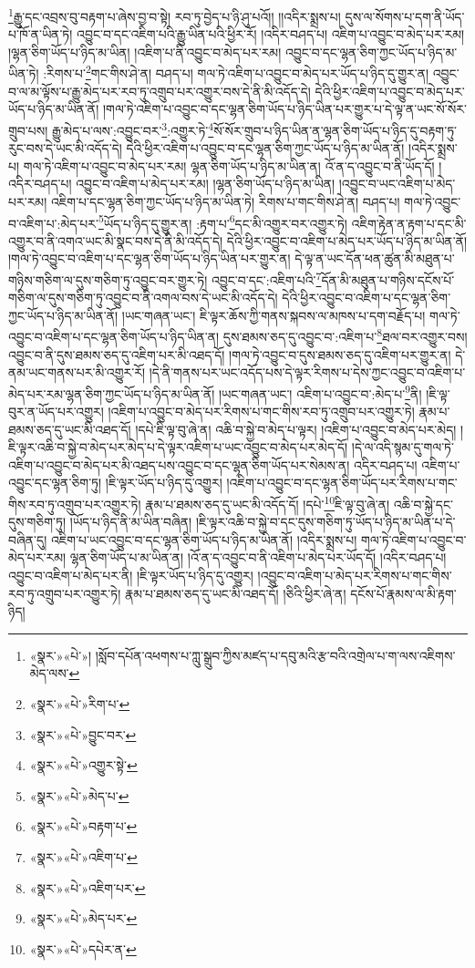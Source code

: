 \footnote{«སྣར་»«པེ་»། །སློབ་དཔོན་འཕགས་པ་ཀླུ་སྒྲུབ་ཀྱིས་མཛད་པ་དབུ་མའི་རྩ་བའི་འགྲེལ་པ་ག་ལས་འཇིགས་མེད་ལས་}རྒྱུ་དང་འབྲས་བུ་བརྟག་པ་ཞེས་བྱ་བ་སྟེ། རབ་ཏུ་བྱེད་པ་ཉི་ཤུ་པའོ།། །།འདིར་སྨྲས་པ། དུས་ལ་སོགས་པ་དག་ནི་ཡོད་པ་ཁོ་ན་ཡིན་ཏེ། འབྱུང་བ་དང་འཇིག་པའི་རྒྱུ་ཡིན་པའི་ཕྱིར་རོ། །འདིར་བཤད་པ། འཇིག་པ་འབྱུང་བ་མེད་པར་རམ། །ལྷན་ཅིག་ཡོད་པ་ཉིད་མ་ཡིན། །འཇིག་པ་ནི་འབྱུང་བ་མེད་པར་རམ། འབྱུང་བ་དང་ལྷན་ཅིག་ཀྱང་ཡོད་པ་ཉིད་མ་ཡིན་ཏེ། :རིགས་པ་\footnote{«སྣར་»«པེ་»རིག་པ་}གང་གིས་ཤེ་ན། བཤད་པ། གལ་ཏེ་འཇིག་པ་འབྱུང་བ་མེད་པར་ཡོད་པ་ཉིད་དུ་གྱུར་ན། འབྱུང་བ་ལ་མ་ལྟོས་པ་རྒྱུ་མེད་པར་རབ་ཏུ་འགྲུབ་པར་འགྱུར་བས་དེ་ནི་མི་འདོད་དེ། དེའི་ཕྱིར་འཇིག་པ་འབྱུང་བ་མེད་པར་ཡོད་པ་ཉིད་མ་ཡིན་ནོ། །གལ་ཏེ་འཇིག་པ་འབྱུང་བ་དང་ལྷན་ཅིག་ཡོད་པ་ཉིད་ཡིན་པར་གྱུར་པ་དེ་ལྟ་ན་ཡང་སོ་སོར་གྲུབ་པས། རྒྱུ་མེད་པ་ལས་:འབྱུང་བར་\footnote{«སྣར་»«པེ་»བྱུང་བར་}:འགྱུར་ཏེ་\footnote{«སྣར་»«པེ་»འགྱུར་སྟེ་}སོ་སོར་གྲུབ་པ་ཉིད་ཡིན་ན་ལྷན་ཅིག་ཡོད་པ་ཉིད་དུ་བརྟག་ཏུ་རུང་བས་དེ་ཡང་མི་འདོད་དེ། དེའི་ཕྱིར་འཇིག་པ་འབྱུང་བ་དང་ལྷན་ཅིག་ཀྱང་ཡོད་པ་ཉིད་མ་ཡིན་ནོ། །འདིར་སྨྲས་པ། གལ་ཏེ་འཇིག་པ་འབྱུང་བ་མེད་པར་རམ། ལྷན་ཅིག་ཡོད་པ་ཉིད་མ་ཡིན་ན། འོ་ན་ད་འབྱུང་བ་ནི་ཡོད་དོ། །འདིར་བཤད་པ། འབྱུང་བ་འཇིག་པ་མེད་པར་རམ། །ལྷན་ཅིག་ཡོད་པ་ཉིད་མ་ཡིན། །འབྱུང་བ་ཡང་འཇིག་པ་མེད་པར་རམ། འཇིག་པ་དང་ལྷན་ཅིག་ཀྱང་ཡོད་པ་ཉིད་མ་ཡིན་ཏེ། རིགས་པ་གང་གིས་ཤེ་ན། བཤད་པ། གལ་ཏེ་འབྱུང་བ་འཇིག་པ་:མེད་པར་\footnote{«སྣར་»«པེ་»མེད་པ་}ཡོད་པ་ཉིད་དུ་གྱུར་ན། :རྟག་པ་\footnote{«སྣར་»«པེ་»བརྟག་པ་}དང་མི་འགྱུར་བར་འགྱུར་ཏེ། འཇིག་རྟེན་ན་རྟག་པ་དང་མི་འགྱུར་བ་ནི་འགའ་ཡང་མི་སྣང་བས་དེ་ནི་མི་འདོད་དེ། དེའི་ཕྱིར་འབྱུང་བ་འཇིག་པ་མེད་པར་ཡོད་པ་ཉིད་མ་ཡིན་ནོ། །གལ་ཏེ་འབྱུང་བ་འཇིག་པ་དང་ལྷན་ཅིག་ཡོད་པ་ཉིད་ཡིན་པར་གྱུར་ན། དེ་ལྟ་ན་ཡང་དོན་ཕན་ཚུན་མི་མཐུན་པ་གཉིས་གཅིག་ལ་དུས་གཅིག་ཏུ་འབྱུང་བར་གྱུར་ཏེ། འབྱུང་བ་དང་:འཇིག་པའི་\footnote{«སྣར་»«པེ་»འཇིག་པ་}དོན་མི་མཐུན་པ་གཉིས་དངོས་པོ་གཅིག་ལ་དུས་གཅིག་ཏུ་འབྱུང་བ་ནི་འགལ་བས་དེ་ཡང་མི་འདོད་དེ། དེའི་ཕྱིར་འབྱུང་བ་འཇིག་པ་དང་ལྷན་ཅིག་ཀྱང་ཡོད་པ་ཉིད་མ་ཡིན་ནོ། །ཡང་གཞན་ཡང་། ཇི་ལྟར་ཆོས་ཀྱི་གནས་སྐབས་ལ་མཁས་པ་དག་བརྗོད་པ། གལ་ཏེ་འབྱུང་བ་འཇིག་པ་དང་ལྷན་ཅིག་ཡོད་པ་ཉིད་ཡིན་ན། དུས་ཐམས་ཅད་དུ་འབྱུང་བ་:འཇིག་པ་\footnote{«སྣར་»«པེ་»འཇིག་པར་}ཐལ་བར་འགྱུར་བས། འབྱུང་བ་ནི་དུས་ཐམས་ཅད་དུ་འཇིག་པར་མི་འཐད་དོ། །གལ་ཏེ་འབྱུང་བ་དུས་ཐམས་ཅད་དུ་འཇིག་པར་གྱུར་ན། དེ་ནམ་ཡང་གནས་པར་མི་འགྱུར་རོ། །དེ་ནི་གནས་པར་ཡང་འདོད་པས་དེ་ལྟར་རིགས་པ་དེས་ཀྱང་འབྱུང་བ་འཇིག་པ་མེད་པར་རམ་ལྷན་ཅིག་ཀྱང་ཡོད་པ་ཉིད་མ་ཡིན་ནོ། །ཡང་གཞན་ཡང་། འཇིག་པ་འབྱུང་བ་:མེད་པ་\footnote{«སྣར་»«པེ་»མེད་པར་}ནི། །ཇི་ལྟ་བུར་ན་ཡོད་པར་འགྱུར། །འཇིག་པ་འབྱུང་བ་མེད་པར་རིགས་པ་གང་གིས་རབ་ཏུ་འགྲུབ་པར་འགྱུར་ཏེ། རྣམ་པ་ཐམས་ཅད་དུ་ཡང་མི་འཐད་དོ། །དཔེ་ཇི་ལྟ་བུ་ཞེ་ན། འཆི་བ་སྐྱེ་བ་མེད་པ་ལྟར། །འཇིག་པ་འབྱུང་བ་མེད་པར་མེད། །ཇི་ལྟར་འཆི་བ་སྐྱེ་བ་མེད་པར་མེད་པ་དེ་ལྟར་འཇིག་པ་ཡང་འབྱུང་བ་མེད་པར་མེད་དོ། །དེ་ལ་འདི་སྙམ་དུ་གལ་ཏེ་འཇིག་པ་འབྱུང་བ་མེད་པར་མི་འཐད་པས་འབྱུང་བ་དང་ལྷན་ཅིག་ཡོད་པར་སེམས་ན། འདིར་བཤད་པ། འཇིག་པ་འབྱུང་དང་ལྷན་ཅིག་ཏུ། །ཇི་ལྟར་ཡོད་པ་ཉིད་དུ་འགྱུར། །འཇིག་པ་འབྱུང་བ་དང་ལྷན་ཅིག་ཡོད་པར་རིགས་པ་གང་གིས་རབ་ཏུ་འགྲུབ་པར་འགྱུར་ཏེ། རྣམ་པ་ཐམས་ཅད་དུ་ཡང་མི་འདོད་དོ། །དཔེ་\footnote{«སྣར་»«པེ་»དཔེར་ན་}ཇི་ལྟ་བུ་ཞེ་ན། འཆི་བ་སྐྱེ་དང་དུས་གཅིག་ཏུ། །ཡོད་པ་ཉིད་ནི་མ་ཡིན་བཞིན། །ཇི་ལྟར་འཆི་བ་སྐྱེ་བ་དང་དུས་གཅིག་ཏུ་ཡོད་པ་ཉིད་མ་ཡིན་པ་དེ་བཞིན་དུ། འཇིག་པ་ཡང་འབྱུང་བ་དང་ལྷན་ཅིག་ཡོད་པ་ཉིད་མ་ཡིན་ནོ། །འདིར་སྨྲས་པ། གལ་ཏེ་འཇིག་པ་འབྱུང་བ་མེད་པར་རམ། ལྷན་ཅིག་ཡོད་པ་མ་ཡིན་ན། །འོ་ན་ད་འབྱུང་བ་ནི་འཇིག་པ་མེད་པར་ཡོད་དོ། །འདིར་བཤད་པ། འབྱུང་བ་འཇིག་པ་མེད་པར་ནི། །ཇི་ལྟར་ཡོད་པ་ཉིད་དུ་འགྱུར། །འབྱུང་བ་འཇིག་པ་མེད་པར་རིགས་པ་གང་གིས་རབ་ཏུ་འགྲུབ་པར་འགྱུར་ཏེ། རྣམ་པ་ཐམས་ཅད་དུ་ཡང་མི་འཐད་དོ། །ཅིའི་ཕྱིར་ཞེ་ན། དངོས་པོ་རྣམས་ལ་མི་རྟག་ཉིད། 